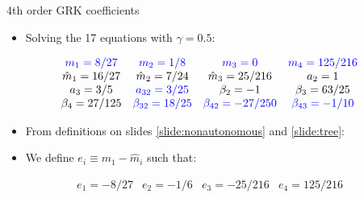 \documentclass[serif]{beamer}
\begin{document}
\begin{frame}{4th order GRK coefficients}
  \begin{itemize}
   \item Solving the 17 equations with $\gamma = 0.5$:
  \end{itemize}
  \begin{equation}
    \begin{array}{cccc}
      \nonumber
      \color{blue} m_1 = 8/27 & \color{blue} m_ 2 = 1/8 & \color{blue} m_3 = 0 & \color{blue} m_4 = 125/216 \\
      \color{black}\hat{m}_1 = 16/27 & \hat{m}_ 2 = 7/24 & \hat{m}_3 = 25/216 & a_2 = 1 \\
      a_3 = 3/5 & \color{blue}{a_{32} = 3/25} & \beta_2 = -1 & \beta_3 = 63/25 \\
      \beta_4 = 27/125 & \color{blue}\beta_{32} = 18/25 & \color{blue} \beta_{42} = -27/250 & \color{blue}\beta_{43} = -1/10
    \end{array}
  \end{equation}
  \begin{itemize}
   \item From definitions on slides \ref{slide:nonautonomous} and \ref{slide:tree}:
  \end{itemize}
  \begin{itemize}
   \item We define $e_i \equiv m_1 - \hat{m}_i$ such that:
  \end{itemize}
  \begin{equation}
    \begin{array}{cccc}
      \nonumber
      e_1 = -8/27 & e_2 = -1/6 & e_3 = -25/216 & e_4 = 125/216
    \end{array}
  \end{equation}
\end{frame}

\end{document}

